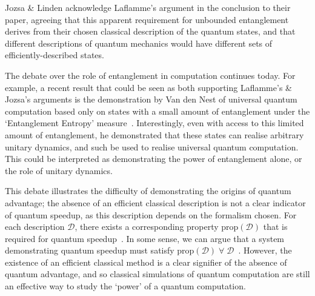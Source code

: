 \documentclass{standalone}
\begin{document}
\par
Jozsa \& Linden acknowledge Laflamme's argument in the conclusion to their paper, agreeing that this apparent requirement for unbounded entanglement derives from their chosen classical description of the quantum states, and that different descriptions of quantum mechanics would have different sets of efficiently-described states. 
\par
The debate over the role of entanglement in computation continues today. For example, a recent result that could be seen as both supporting Laflamme's \& Jozsa's arguments is the demonstration by Van den Nest of universal quantum computation based only on states with a small amount of entanglement under the `Entanglement Entropy' measure~\cite{VanDenNest2013}. Interestingly, even with access to this limited amount of entanglement, he demonstrated that these states can realise arbitrary unitary dynamics, and such be used to realise universal quantum computation. This could be interpreted as demonstrating the power of entanglement alone, or the role of unitary dynamics.
\par
This debate illustrates the difficulty of demonstrating the origins of quantum advantage; the absence of an efficient classical description is not a clear indicator of quantum speedup, as this description depends on the formalism chosen. For each description $\mathcal{D}$, there exists a corresponding property $\text{prop}\left(\mathcal{D}\right)$ that is required for quantum speedup~\cite{Jozsa2003}. In some sense, we can argue that a system demonstrating quantum speedup must satisfy $\text{prop}(\mathcal{D})\;\forall\;\mathcal{D}$~\cite{Jozsa2003,Laflamme2001}. However, the existence of an efficient classical method is a clear signifier of the absence of quantum advantage, and so classical simulations of quantum computation are still an effective way to study the `power' of a quantum computation.
\par
\end{document}
